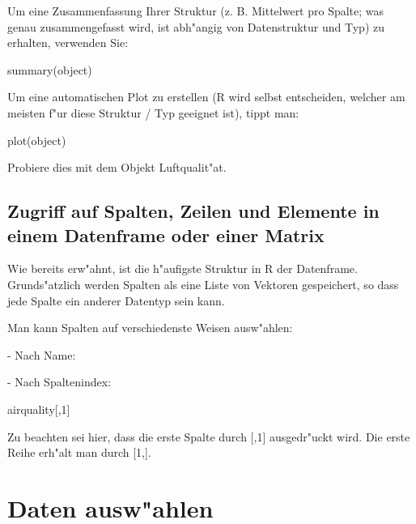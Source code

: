 \documentclass[a4paper,twoside]{tufte-book}\usepackage[]{graphicx}\usepackage[]{color}
\begin{document}
\begin{appendices}
Um eine Zusammenfassung Ihrer Struktur (z. B. Mittelwert pro Spalte; was genau zusammengefasst wird, ist abh"angig von Datenstruktur und Typ) zu erhalten, verwenden Sie:

\begin{Schunk}
\begin{Sinput}
summary(object)
\end{Sinput}
\end{Schunk}

Um eine automatischen Plot zu erstellen (R wird selbst entscheiden, welcher am meisten f"ur diese Struktur / Typ geeignet ist), tippt man:

\begin{Schunk}
\begin{Sinput}
plot(object)
\end{Sinput}
\end{Schunk}

Probiere dies mit dem Objekt Luftqualit"at.

\subsection{Zugriff auf Spalten, Zeilen und Elemente in einem Datenframe oder einer Matrix}

Wie bereits erw"ahnt, ist die h"aufigste Struktur in R der Datenframe. Grunds"atzlich werden Spalten als eine Liste von Vektoren gespeichert, so dass jede Spalte ein anderer Datentyp sein kann.

Man kann Spalten auf verschiedenste Weisen ausw"ahlen:

- Nach Name:
\begin{Schunk}
\end{Schunk}

- Nach Spaltenindex: 

\begin{Schunk}
\begin{Sinput}
airquality[,1]
\end{Sinput}
\end{Schunk}

Zu beachten sei hier, dass die erste Spalte durch [,1] ausgedr"uckt wird. Die erste Reihe erh"alt man durch [1,].

\section{Daten ausw"ahlen}


\end{appendices}
\end{document}
